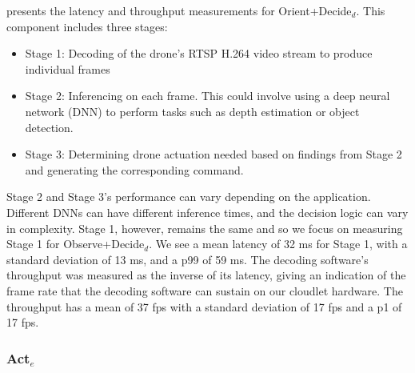  presents the latency and throughput measurements
for Orient+Decide$_d$. This component includes three stages:

\begin{itemize}
\item Stage 1: Decoding of the drone's RTSP H.264 video stream to produce
    individual frames
\item Stage 2: Inferencing on each frame. This could involve using a deep
    neural network (DNN) to perform tasks such as depth estimation or object
    detection.
\item Stage 3: Determining drone actuation needed based on findings from Stage
    2 and generating the corresponding command.
\end{itemize}

Stage 2 and Stage 3's performance can vary depending on the application.
Different DNNs can have different inference times, and the decision logic can
vary in complexity.  Stage 1, however, remains the same and so we focus on
measuring Stage 1 for Observe+Decide$_d$. We see a mean latency of 32 ms for
Stage 1, with a standard deviation of 13 ms, and a p99 of 59 ms. The decoding
software's throughput was measured as the inverse of its latency, giving an
indication of the frame rate that the decoding software can sustain on our
cloudlet hardware. The throughput has a mean of 37 fps with a standard
deviation of 17 fps and a p1 of 17 fps.

\subsubsection{\texorpdfstring{Act$_e$}{Act\_e}}

